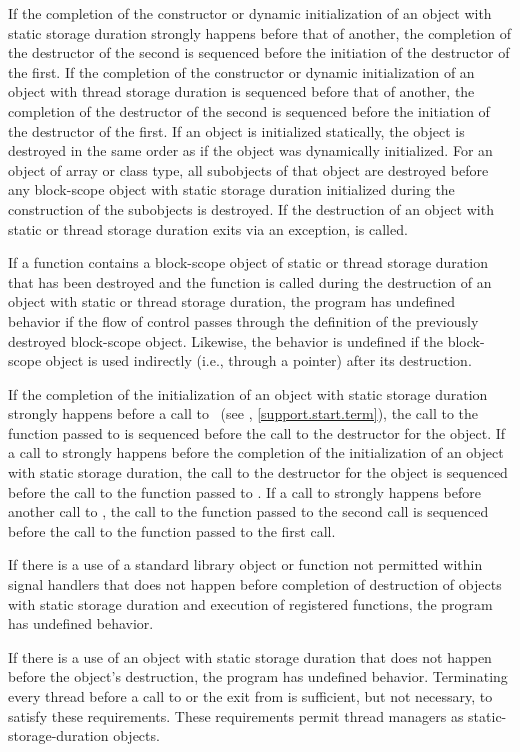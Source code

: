 \pnum
If the completion of the constructor or dynamic initialization of an object with static
storage duration strongly happens before that of another, the completion of the destructor
of the second is sequenced before the initiation of the destructor of the first.
If the completion of the constructor or dynamic initialization of an object with thread
storage duration is sequenced before that of another, the completion of the destructor
of the second is sequenced before the initiation of the destructor of the first.
If an object is
initialized statically, the object is destroyed in the same order as if
the object was dynamically initialized. For an object of array or class
type, all subobjects of that object are destroyed before any block-scope
object with static storage duration initialized during the construction
of the subobjects is destroyed.
If the destruction of an object with static or thread storage duration
exits via an exception,
 is called.

\pnum
If a function contains a block-scope object of static or thread storage duration that has been
destroyed and the function is called during the destruction of an object with static or
thread storage duration, the program has undefined behavior if the flow of control
passes through the definition of the previously destroyed block-scope object. Likewise, the
behavior is undefined if the block-scope object is used indirectly (i.e., through a
pointer) after its destruction.

\pnum
{}%
%
If the completion of the initialization of an object with static storage
duration strongly happens before a call to ~(see
, \ref{support.start.term}), the call to the function passed to
 is sequenced before the call to the destructor for the object. If a
call to  strongly happens before the completion of the initialization of
an object with static storage duration, the call to the destructor for the
object is sequenced before the call to the function passed to . If a
call to  strongly happens before another call to , the
call to the function passed to the second  call is sequenced before
the call to the function passed to the first  call.

\pnum
If there is a use of a standard library object or function not permitted within signal
handlers that does not happen before
completion of destruction of objects with static storage duration and execution of
 registered functions, the program has
undefined behavior. \begin{note} If there is a use of an object with static storage
duration that does not happen before the object's destruction, the program has undefined
behavior. Terminating every thread before a call to  or the exit from
 is sufficient, but not necessary, to satisfy these requirements. These
requirements permit thread managers as static-storage-duration objects. \end{note}

